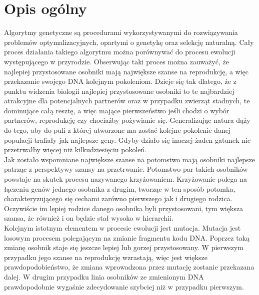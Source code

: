 \documentclass[twoside]{iisthesis}
\begin{document}
\section{Opis ogólny}
Algorytmy genetyczne są procedurami wykorzystywanymi do rozwiązywania problemów optymalizacyjnych, opartymi o genetykę oraz selekcję naturalną. Cały proces działania takiego algorytmu można porównywać do procesu ewolucji występującego w przyrodzie. Obserwując taki proces można zauważyć, że najlepiej przystosowane osobniki mają największe szanse na reprodukcję, a więc przekazanie swojego DNA kolejnym pokoleniom. Dzieje się tak dlatego, że z punktu widzenia biologii najlepiej przystosowane osobniki to te najbardziej atrakcyjne dla potencjalnych partnerów oraz w przypadku zwierząt stadnych, te dominujące całą resztę, a więc mające pierwszeństwo jeśli chodzi o wybór partnerów, reprodukcję czy chociażby pożywianie się. Generalizując natura dąży do tego, aby do puli z której utworzone ma zostać kolejne pokolenie danej populacji trafiały jak najlepsze geny. Gdyby działo się inaczej żaden gatunek nie przetrwałby więcej niż kilkudziesięciu pokoleń.\\
Jak zostało wspomniane największe szanse na potomstwo mają osobniki najlepsze patrząc z perspektywy szansy na przetrwanie. Potomstwo par takich osobników powstaje na skutek procesu nazywanego krzyżowaniem. Krzyżowanie polega na łączeniu genów jednego osobnika z drugim, tworząc w ten sposób potomka, charakteryzującego się cechami zarówno pierwszego jak i drugiego rodzica. Oczywiście im lepiej rodzice danego osobnika byli przystosowani, tym większa szansa, że również i on będzie stał wysoko w hierarchii.\\
Kolejnym istotnym elementem w procesie ewolucji jest mutacja. Mutacja jest losowym procesem polegającym na zmianie fragmentu kodu DNA. Poprzez taką zmianę osobnik staje się jeszcze lepiej lub gorzej przystosowany. W pierwszym przypadku jego szanse na reprodukcję wzrastają, więc jest większe prawdopodobieństwo, że zmiana wprowadzona przez mutację zostanie przekazana dalej. W drugim przypadku linia osobników ze zmienionym DNA prawdopodobnie wygaśnie zdecydowanie szybciej niż w przypadku pierwszym.
\end{document}
